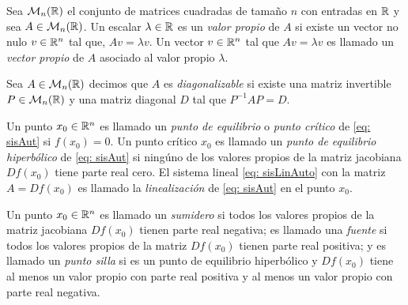     Sea $\mathcal{M}_{n}({\mathbb{R}})$ el conjunto de matrices cuadradas de tamaño $n$ con entradas en ${\mathbb{R}}$ y sea $A \in \mathcal{M}_{n}({\mathbb{R}})$. Un escalar $\lambda \in {\mathbb{R}}$ es un \textit{valor propio} de $A$ si existe un vector no nulo $v \in {\mathbb{R}}^{n}$ tal que, $Av = \lambda v$. Un vector $v \in {\mathbb{R}}^{n}$ tal que $Av = \lambda v$ es llamado un \textit{vector propio} de $A$ asociado al valor propio $\lambda$.
   
    Sea $A \in \mathcal{M}_{n}({\mathbb{R}})$ decimos que $A$ es \textit{diagonalizable} si existe una matriz invertible $P \in \mathcal{M}_{n}({\mathbb{R}})$ y una matriz diagonal $D$ tal que $P^{-1}AP = D$.
   
    Un punto $x_{0} \in {\mathbb{R}}^{n}$ es llamado un \textit{punto de equilibrio} o \textit{punto crítico} de \eqref{eq: sisAut} si $f(x_{0})=0$. Un punto crítico $x_{0}$ es llamado un \textit{punto de equilibrio hiperbólico} de \eqref{eq: sisAut} si ningúno de los valores propios de la matriz jacobiana $Df(x_{0})$ tiene parte real cero. El sistema lineal \eqref{eq: sisLinAuto} con la matriz $A = Df(x_{0})$ es llamado la \textit{linealización} de \eqref{eq: sisAut} en el punto $x_{0}$.
   
    Un punto $x_{0} \in {\mathbb{R}}^{n}$ es llamado un \textit{sumidero} si todos los valores propios de la matriz jacobiana $Df(x_{0})$ tienen parte real negativa; es llamado una \textit{fuente} si todos los valores propios de la matriz $Df(x_{0})$ tienen parte real positiva; y es llamado un \textit{punto silla} si es un punto de equilibrio hiperbólico y $Df(x_{0})$ tiene al menos un valor propio con parte real positiva y al menos un valor propio con parte real negativa.
   
   
   
   